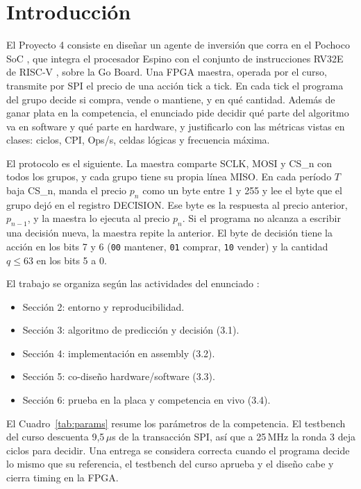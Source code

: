 \documentclass[11pt,letterpaper]{article}
\begin{document}
\newpage
\tableofcontents
\newpage

\section{Introducción}

El Proyecto 4 consiste en diseñar un agente de inversión que corra en el Pochoco SoC \cite{pochoco},
que integra el procesador Espino con el conjunto de instrucciones RV32E de RISC-V \cite{riscv}, sobre
la Go Board. Una FPGA maestra, operada por el curso, transmite por SPI el precio de una acción tick a
tick. En cada tick el programa del grupo decide si compra, vende o mantiene, y en qué cantidad. Además
de ganar plata en la competencia, el enunciado \cite{enunciado} pide decidir qué parte del algoritmo
va en software y qué parte en hardware, y justificarlo con las métricas vistas en clases: ciclos, CPI,
Ops/s, celdas lógicas y frecuencia máxima.

El protocolo es el siguiente. La maestra comparte SCLK, MOSI y CS\_n con todos los grupos, y cada grupo
tiene su propia línea MISO. En cada período $T$ baja CS\_n, manda el precio $p_n$ como un byte entre 1 y
255 y lee el byte que el grupo dejó en el registro DECISION. Ese byte es la respuesta al precio anterior,
$p_{n-1}$, y la maestra lo ejecuta al precio $p_n$. Si el programa no alcanza a escribir una decisión
nueva, la maestra repite la anterior. El byte de decisión tiene la acción en los bits 7 y 6
(\texttt{00} mantener, \texttt{01} comprar, \texttt{10} vender) y la cantidad $q \le 63$ en los bits 5 a 0.

El trabajo se organiza según las actividades del enunciado \cite{enunciado}:

\begin{itemize}
\item Sección 2: entorno y reproducibilidad.
\item Sección 3: algoritmo de predicción y decisión (3.1).
\item Sección 4: implementación en assembly (3.2).
\item Sección 5: co-diseño hardware/software (3.3).
\item Sección 6: prueba en la placa y competencia en vivo (3.4).
\end{itemize}

El Cuadro~\ref{tab:params} resume los parámetros de la competencia. El testbench del curso descuenta
9,5\,$\mu$s de la transacción SPI, así que a 25\,MHz la ronda 3 deja \Presupuesto{} ciclos para decidir.
Una entrega se considera correcta cuando el programa decide lo mismo que su referencia, el testbench del
curso aprueba y el diseño cabe y cierra timing en la FPGA.
\end{document}
